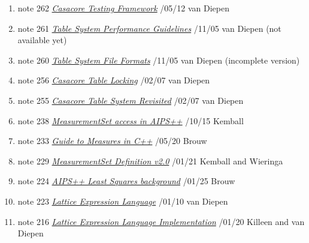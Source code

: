 %

\begin{enumerate}

\item
note 262
\href{262.html}{\textit{Casacore Testing Framework}}
/05/12 van Diepen

\item
note 261
\href{261.html}{\textit{Table System Performance Guidelines}}
/11/05 van Diepen (not available yet)

\item
note 260
\href{260.html}{\textit{Table System File Formats}}
/11/05 van Diepen (incomplete version)

\item
note 256
\href{256.html}{\textit{Casacore Table Locking}}
/02/07 van Diepen

\item
note 255
\href{255.html}{\textit{Casacore Table System Revisited}}
/02/07 van Diepen

\item
note 238
\href{238.html}{\textit{MeasurementSet access in AIPS++}}
/10/15 Kemball

\item
note 233
\href{233.html}{\textit{Guide to Measures in C++}}
/05/20 Brouw

\item
note 229
\href{229.html}{\textit{MeasurementSet Definition v2.0}}
/01/21 Kemball and Wieringa

\item
note 224
\href{224.html}{\textit{AIPS++ Least Squares background}}
/01/25 Brouw

\item
note 223
\href{223.html}{\textit{Lattice Expression Language}}
/01/10 van Diepen

\item
note 216
\href{216.html}{\textit{Lattice Expression Language Implementation}}
/01/20 Killeen and van Diepen


\end{enumerate}
